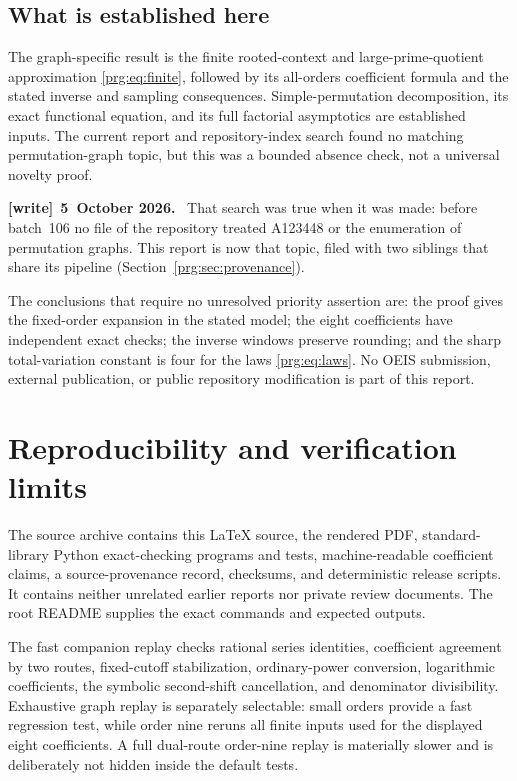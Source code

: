 \documentclass[11pt,letterpaper]{article}
\numberwithin{equation}{section}
\theoremstyle{definition}\newtheorem{definition}[theorem]{Definition}
\theoremstyle{remark}\newtheorem{remark}[theorem]{Remark}
\newenvironment{writenote}[1][]{\par\smallskip\begingroup\small
 \noindent\textbf{[write]}\if\relax\detokenize{#1}\relax\else~\textbf{#1.}\fi\ }%
 {\par\endgroup\smallskip}
\begin{document}
\subsection{What is established here}
The graph-specific result is the finite rooted-context and
large-prime-quotient approximation \eqref{prg:eq:finite}, followed by
its all-orders coefficient formula and the stated inverse and
sampling consequences. Simple-permutation decomposition, its exact
functional equation, and its full factorial asymptotics are
established inputs. The current report and repository-index search
found no matching permutation-graph topic, but this was a bounded
absence check, not a universal novelty proof.

\begin{writenote}[5~October 2026]
That search was true when it was made: before batch~106 no file of the
repository treated A123448 or the enumeration of permutation graphs. This
report is now that topic, filed with two siblings that share its pipeline
(Section~\ref{prg:sec:provenance}).
\end{writenote}

The conclusions that require no unresolved priority assertion are:
the proof gives the fixed-order expansion in the stated model;
the eight coefficients have independent exact checks; the inverse
windows preserve rounding; and the sharp total-variation constant
is four for the laws \eqref{prg:eq:laws}. No OEIS submission, external
publication, or public repository modification is part of this
report.

\section{Reproducibility and verification limits}\label{prg:sec:replay}

The source archive contains this LaTeX source, the rendered PDF,
standard-library Python exact-checking programs and tests,
machine-readable coefficient claims, a source-provenance record,
checksums, and deterministic release scripts. It contains neither
unrelated earlier reports nor private review documents. The root
README supplies the exact commands and expected outputs.

The fast companion replay checks rational series identities,
coefficient agreement by two routes, fixed-cutoff stabilization,
ordinary-power conversion, logarithmic coefficients, the symbolic
second-shift cancellation, and denominator divisibility. Exhaustive
graph replay is separately selectable: small orders provide a fast
regression test, while order nine reruns all finite inputs used for
the displayed eight coefficients. A full dual-route order-nine
replay is materially slower and is deliberately not hidden inside
the default tests.
\end{document}

